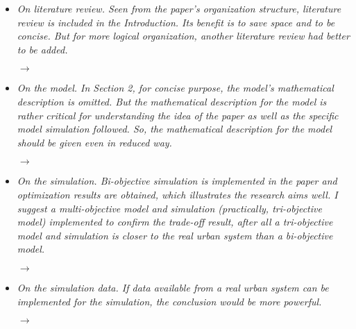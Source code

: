 \documentclass[10pt,a4paper,sans]{moderncv}        %
\begin{document}
\begin{itemize}
    \item \textit{On literature review. Seen from the paper's organization structure, literature review is included in the Introduction. Its benefit is to save space and to be concise. But for more logical organization, another literature review had better to be added.}
    
    \medskip
    
    $\rightarrow$ 
    
    \bigskip
    
    \item \textit{On the model. In Section 2, for concise purpose, the model's mathematical description is omitted. But the mathematical description for the model is rather critical for understanding the idea of the paper as well as the specific model simulation followed. So, the mathematical description for the model should be given even in reduced way.}
    
    \medskip
    
    $\rightarrow$
    
    \bigskip
    
    \item \textit{On the simulation. Bi-objective simulation is implemented in the paper and optimization results are obtained, which illustrates the research aims well. I suggest a multi-objective model and simulation (practically, tri-objective model) implemented to confirm the trade-off result, after all a tri-objective model and simulation is closer to the real urban system than a bi-objective model.}
    
    \medskip
    
    $\rightarrow$
    
    \bigskip
    
    \item \textit{On the simulation data. If data available from a real urban system can be implemented for the simulation, the conclusion would be more powerful.}
    
    \medskip

    $\rightarrow$    
    
\end{itemize}
\end{document}
